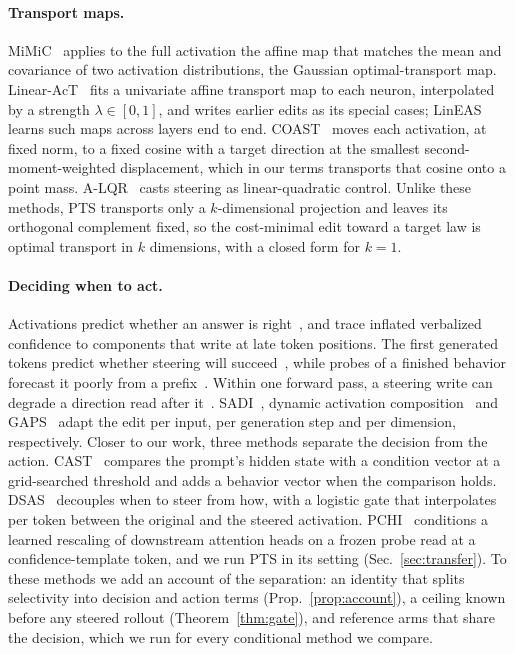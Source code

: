 \paragraph{Transport maps.} MiMiC~\citep{singh2024mimic} applies to the full
activation the affine map that matches the mean and covariance of two
activation distributions, the Gaussian optimal-transport map.
Linear-AcT~\citep{rodriguez2025act} fits a univariate affine transport map to
each neuron, interpolated by a strength $\lambda\in[0,1]$, and writes earlier
edits as its special cases; LinEAS~\citep{rodriguez2025lineas} learns such maps
across layers end to end. COAST~\citep{nguyen2026coast} moves each activation,
at fixed norm, to a fixed cosine with a target direction at the smallest
second-moment-weighted displacement, which in our terms transports that cosine
onto a point mass. A-LQR~\citep{nguyen2026alqr} casts steering as
linear-quadratic control. Unlike these methods, PTS transports only a
$k$-dimensional projection and leaves its orthogonal complement fixed, so the
cost-minimal edit toward a target law is optimal transport in $k$ dimensions,
with a closed form for $k=1$.

\paragraph{Deciding when to act.} Activations predict whether an answer is
right~\citep{kadavath2022know,azaria2023lying}, and \citet{zhao2026wired} trace
inflated verbalized confidence to components that write at late token
positions. The first generated tokens predict whether steering will
succeed~\citep{steerable2026}, while probes of a finished behavior forecast it
poorly from a prefix~\citep{fpcg2026}. Within one forward pass, a steering
write can degrade a direction read after it~\citep{luo2026yopo}.
SADI~\citep{wang2025sadi}, dynamic activation
composition~\citep{scalena2024dynamic} and GAPS~\citep{gaps2026} adapt the edit
per input, per generation step and per dimension, respectively. Closer to our
work, three methods separate the decision from the action.
CAST~\citep{lee2024cast} compares the prompt's hidden state with a condition
vector at a grid-searched threshold and adds a behavior vector when the
comparison holds. DSAS~\citep{ferrando2026dsas} decouples when to steer from
how, with a logistic gate that interpolates per token between the original and the
steered activation. PCHI~\citep{liu2026probe} conditions a learned
rescaling of downstream attention heads on a frozen probe read at a
confidence-template token, and we run PTS in its setting
(Sec.~\ref{sec:transfer}). To these methods we add an account of the
separation: an identity
that splits selectivity into decision and action terms
(Prop.~\ref{prop:account}), a ceiling known before any steered rollout
(Theorem~\ref{thm:gate}), and reference arms that share the decision, which
we run for every conditional method we compare.

